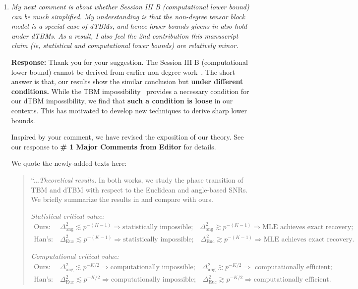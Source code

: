 \documentclass[11pt]{article}
\theoremstyle{definition}
\theoremstyle{definition}
\begin{document}
\begin{enumerate}[wide, labelwidth=!, labelindent=0pt]
\item \textit{My next comment is about whether Session III B (computational lower bound) can be much simplified. My understanding is that the non-degree tensor block model is a special case of dTBMs, and hence lower bounds givens in \cite{han2020exact} also hold under dTBMs. As a result, I also feel the 2nd contribution this manuscript claim (ie, statistical and computational lower bounds) are relatively minor.}

\textbf{Response:} Thank you for your suggestion. The Session III B (computational lower bound) cannot be derived from earlier non-degree work~\citep{han2020exact}. The short answer is that, our results show the similar conclusion but {\bf under different conditions.} While the TBM impossibility~\citep{han2020exact} provides a necessary condition for our dTBM impossibility, we find that {\bf such a condition is loose} in our contexts. This has motivated to develop new techniques to derive sharp lower bounds. 

Inspired by your comment, we have revised the exposition of our theory. See our response to \textbf{\# 1 Major Comments from Editor} for details.

We quote the newly-added texts here:
\begin{quote}
    ``...\emph{Theoretical results.} In both works, we study the phase transition of TBM and dTBM with respect to the Euclidean and angle-based SNRs. We briefly summarize the results in \cite{han2020exact} and compare with ours. 
    
    \textit{Statistical critical value:}
    \begin{align}
        \text{Ours:}& \ \Delta_{\text{ang}}^2 \lesssim p^{-(K-1)} \Rightarrow \text{statistically impossible;} \quad \Delta_{\text{ang}}^2 \gtrsim   p^{-(K-1)} \Rightarrow \text{MLE achieves exact recovery;} \\
        \text{Han's:}& \ \Delta_{\text{Euc}}^2 \lesssim p^{-(K-1)} \Rightarrow \text{statistically impossible;} \quad \Delta_{\text{Euc}}^2 \gtrsim   p^{-(K-1)} \Rightarrow \text{MLE achieves exact recovery}.
    \end{align}
    
     \textit{Computational critical value:}
    \begin{align}
        \text{Ours:}& \ \Delta_{\text{ang}}^2 \lesssim p^{-K/2} \Rightarrow \text{computationally impossible;} \quad \Delta_{\text{ang}}^2 \gtrsim   p^{-K/2} \Rightarrow \text{ computationally efficient;} \\
        \text{Han's:}& \ \Delta_{\text{Euc}}^2 \lesssim p^{-K/2} \Rightarrow \text{computationally impossible;} \quad \Delta_{\text{Euc}}^2 \gtrsim   p^{-K/2} \Rightarrow \text{computationally efficient}.
    \end{align}
    

\end{quote}
\end{enumerate}
\end{document}
